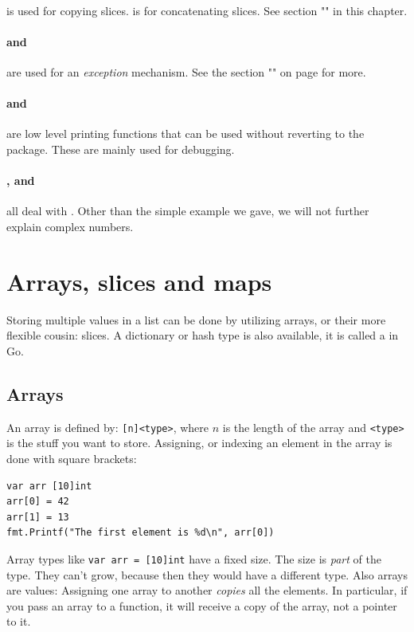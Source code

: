 \paragraph{} is used for copying slices.  is 
for concatenating slices. See section "" in this
chapter.

\paragraph{ and } are used for an 
\emph{exception} mechanism. See the section "" on 
page \pageref{sec:panic} for more.

\paragraph{ and } are low level printing
functions that can be used without reverting to the
package. These are mainly used for debugging.

\paragraph{,  and } all deal with
. Other than the simple example
we gave, we will not further explain complex numbers.


\section{Arrays, slices and maps}
\label{sec:arrays}
Storing multiple values in a list can be done by utilizing arrays, or
their more flexible cousin: slices. A dictionary or hash type is also
available, it is called a  in Go.

\subsection{Arrays}
An array is defined by: \verb|[n]<type>|, where $n$ is the length
of the array and \verb|<type>| is the stuff you want to store.
Assigning, or indexing an element in the array is done with square
brackets:
\begin{lstlisting}
var arr [10]int
arr[0] = 42
arr[1] = 13
fmt.Printf("The first element is %d\n", arr[0])
\end{lstlisting}
Array types like \lstinline{var arr = [10]int} have a fixed size. The
size is \emph{part} of the type.
They can't grow, because then they would have a different type. Also arrays
are values: Assigning one array to another \emph{copies} all the elements.
In particular, if you pass an array to a function, it will receive a
copy of the array, not a pointer to it. 

